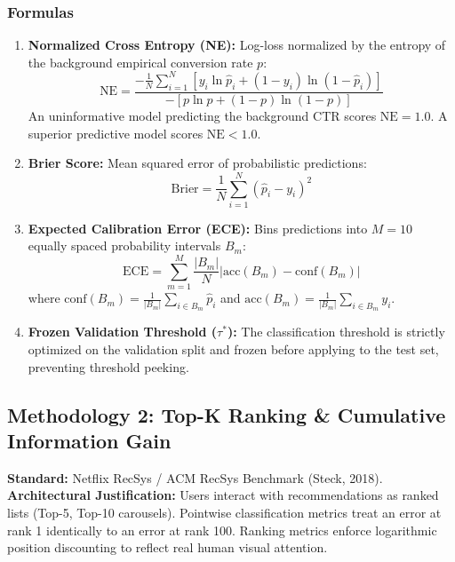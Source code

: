 \documentclass[11pt,a4paper]{article}
\begin{document}
\subsubsection{Formulas}
\begin{enumerate}
    \item \textbf{Normalized Cross Entropy (NE):}
    Log-loss normalized by the entropy of the background empirical conversion rate $p$:
    \begin{equation}
        \text{NE} = \frac{-\frac{1}{N} \sum_{i=1}^N \left[ y_i \ln \hat{p}_i + (1 - y_i) \ln (1 - \hat{p}_i) \right]}{-\left[ p \ln p + (1 - p) \ln (1 - p) \right]}
    \end{equation}
    An uninformative model predicting the background CTR scores $\text{NE} = 1.0$. A superior predictive model scores $\text{NE} < 1.0$.
    \item \textbf{Brier Score:}
    Mean squared error of probabilistic predictions:
    \begin{equation}
        \text{Brier} = \frac{1}{N} \sum_{i=1}^N (\hat{p}_i - y_i)^2
    \end{equation}
    \item \textbf{Expected Calibration Error (ECE):}
    Bins predictions into $M = 10$ equally spaced probability intervals $B_m$:
    \begin{equation}
        \text{ECE} = \sum_{m=1}^M \frac{|B_m|}{N} \left| \text{acc}(B_m) - \text{conf}(B_m) \right|
    \end{equation}
    where $\text{conf}(B_m) = \frac{1}{|B_m|} \sum_{i \in B_m} \hat{p}_i$ and $\text{acc}(B_m) = \frac{1}{|B_m|} \sum_{i \in B_m} y_i$.
    \item \textbf{Frozen Validation Threshold ($\tau^*$):}
    The classification threshold is strictly optimized on the validation split and frozen before applying to the test set, preventing threshold peeking.
\end{enumerate}

\subsection{Methodology 2: Top-K Ranking \& Cumulative Information Gain}
\textbf{Standard:} Netflix RecSys / ACM RecSys Benchmark (Steck, 2018).\\
\textbf{Architectural Justification:} Users interact with recommendations as ranked lists (Top-5, Top-10 carousels). Pointwise classification metrics treat an error at rank 1 identically to an error at rank 100. Ranking metrics enforce logarithmic position discounting to reflect real human visual attention.
\end{document}
